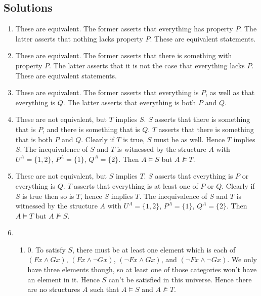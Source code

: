 \newpage
\begin{mdframed}[linewidth=1]
\section*{Solutions}
\begin{enumerate}
    \item These are equivalent. The former asserts that everything has property $P$. The latter asserts that nothing lacks property $P$. These are equivalent statements. 

    \item These are equivalent. The former asserts that there is something with property $P$. The latter asserts that it is not the case that everything lacks $P$. These are equivalent statements. 

    \item These are equivalent. The former asserts that everything is $P$, as well as that everything is $Q$. The latter asserts that everything is both $P$ and $Q$.

    \item These are not equivalent, but $T$ implies $S$. $S$ asserts that there is something that is $P$, and there is something that is $Q$. $T$ asserts that there is something that is both $P$ and $Q$. Clearly if $T$ is true, $S$ must be as well. Hence $T$ implies $S$. The inequivalence of $S$ and $T$ is witnessed by the structure $A$ with $U^A = \{1, 2\}$, $P^A = \{1\}$, $Q^A = \{2\}$. Then $A \models S$ but $A \not \models T$. 

    \item These are not equivalent, but $S$ implies $T$. $S$ asserts that everything is $P$ or everything is $Q$. $T$ asserts that everything is at least one of $P$ or $Q$. Clearly if $S$ is true then so is $T$, hence $S$ implies $T$. The inequivalence of $S$ and $T$ is witnessed by the structure $A$ with $U^A = \{1, 2\}$, $P^A = \{1\}$, $Q^A = \{2\}$. Then $A \models T$ but $A \not \models S$. 

    \item 
    \begin{enumerate}
        \item 0. To satisfy $S$, there must be at least one element which is each of $(Fx \land Gx)$, $(Fx \land \lnot Gx)$, $(\lnot Fx \land Gx)$, and $(\lnot Fx \land \lnot Gx)$. We only have three elements though, so at least one of those categories won't have an element in it. Hence $S$ can't be satisfied in this universe. Hence there are no structures $A$ such that $A \models S$ and $A \not \models T$. 


\end{enumerate}
\end{enumerate}
\end{mdframed}
